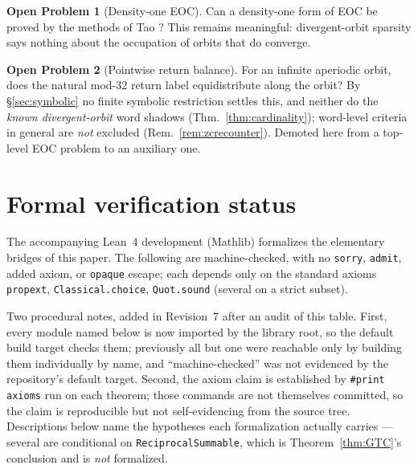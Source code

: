 \documentclass[11pt]{article}
\theoremstyle{plain}
\theoremstyle{definition}
\newtheorem{openproblem}{Open Problem}
\theoremstyle{remark}
\begin{document}
\begin{openproblem}[Density-one EOC]\label{op:G}
Can a density-one form of EOC be proved by the methods of Tao \cite{Tao}? This remains meaningful:
divergent-orbit sparsity says nothing about the occupation of orbits that do converge.
\end{openproblem}

\begin{openproblem}[Pointwise return balance]\label{op:H}
For an infinite aperiodic orbit, does the natural mod-$32$ return label equidistribute along the
orbit? By \S\ref{sec:symbolic} no finite symbolic restriction settles this, and neither do the
\emph{known divergent-orbit} word shadows (Thm.~\ref{thm:cardinality}); word-level criteria in
general are \emph{not} excluded (Rem.~\ref{rem:zcrecounter}). Demoted here from a top-level EOC problem to an auxiliary one.
\end{openproblem}

\section{Formal verification status}\label{sec:lean}

The accompanying Lean~4 development (Mathlib) formalizes the elementary bridges of this paper. The
following are machine-checked, with no \texttt{sorry}, \texttt{admit}, added axiom, or
\texttt{opaque} escape; each depends only on the standard axioms \texttt{propext},
\texttt{Classical.choice}, \texttt{Quot.sound} (several on a strict subset).

Two procedural notes, added in Revision~7 after an audit of this table. First, every module named
below is now imported by the library root, so the default build target checks them; previously all
but one were reachable only by building them individually by name, and ``machine-checked'' was not
evidenced by the repository's default target. Second, the axiom claim is established by
\texttt{\#print axioms} run on each theorem; those commands are not themselves committed, so the
claim is reproducible but not self-evidencing from the source tree. Descriptions below name the
hypotheses each formalization actually carries --- several are conditional on
\texttt{ReciprocalSummable}, which is Theorem~\ref{thm:GTC}'s conclusion and is \emph{not}
formalized.
\end{document}
